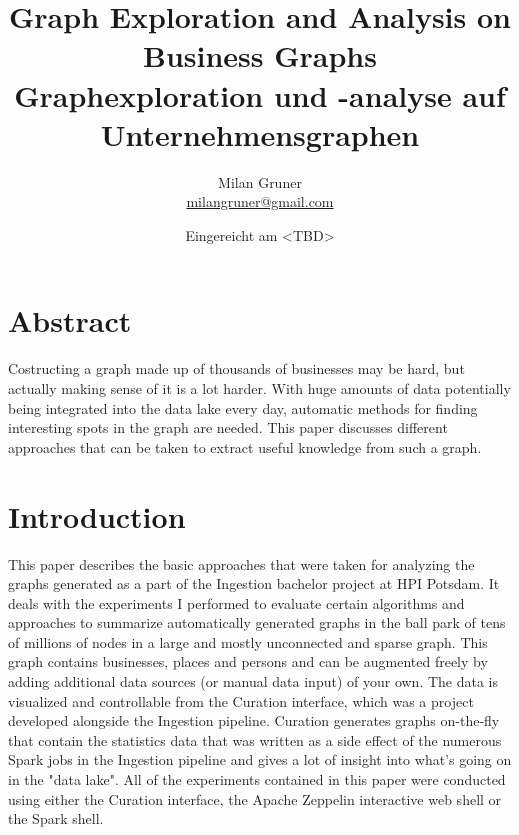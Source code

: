 \documentclass[
        a4paper,     %
        titlepage,   %
        oneside,     %
        parskip      %
        ]{scrartcl}  %
\title{
  Graph Exploration and Analysis on Business Graphs
  \\ \bigskip
  \large{Graphexploration und -analyse auf Unternehmensgraphen}
}
\author{Milan Gruner\\{\small{\url{milangruner@gmail.com}}}}
\date{Eingereicht am <TBD>}
\begin{document}
  \maketitle    %
  \clearpage %

  \section*{Abstract}
  { \large
    Costructing a graph made up of thousands of businesses may be hard, but actually making sense of it is a lot harder.
    With huge amounts of data potentially being integrated into the data lake every day, automatic methods for finding interesting spots in the graph are needed.
    This paper discusses different approaches that can be taken to extract useful knowledge from such a graph.
  }

  \clearpage
  \tableofcontents


  \section{Introduction}
    This paper describes the basic approaches that were taken for analyzing the
    graphs generated as a part of the Ingestion bachelor project at HPI Potsdam.
    It deals with the experiments I performed to evaluate certain algorithms and approaches to summarize
    automatically generated graphs in the ball park of tens of millions of nodes in
    a large and mostly unconnected and sparse graph.
    This graph contains businesses, places and persons and can be augmented freely by adding
    additional data sources (or manual data input) of your own. The data is visualized and controllable from the
    Curation interface, which was a project developed alongside the Ingestion pipeline.
    Curation generates graphs on-the-fly that contain the statistics data that was written
    as a side effect of the numerous Spark jobs in the Ingestion pipeline and gives
    a lot of insight into what's going on in the "data lake".
    All of the experiments contained in this paper were conducted using either
    the Curation interface, the Apache Zeppelin interactive web shell or the Spark shell.
\end{document}
